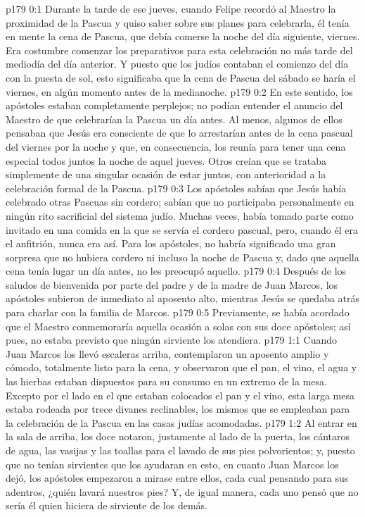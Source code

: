 \author{Comisión de seres intermedios}
\vs p179 0:1 Durante la tarde de ese jueves, cuando Felipe recordó al Maestro la proximidad de la Pascua y quiso saber sobre sus planes para celebrarla, él tenía en mente la cena de Pascua, que debía comerse la noche del día siguiente, viernes. Era costumbre comenzar los preparativos para esta celebración no más tarde del mediodía del día anterior. Y puesto que los judíos contaban el comienzo del día con la puesta de sol, esto significaba que la cena de Pascua del sábado se haría el viernes, en algún momento antes de la medianoche.
\vs p179 0:2 En este sentido, los apóstoles estaban completamente perplejos; no podían entender el anuncio del Maestro de que celebrarían la Pascua un día antes. Al menos, algunos de ellos pensaban que Jesús era consciente de que lo arrestarían antes de la cena pascual del viernes por la noche y que, en consecuencia, los reunía para tener una cena especial todos juntos la noche de aquel jueves. Otros creían que se trataba simplemente de una singular ocasión de estar juntos, con anterioridad a la celebración formal de la Pascua.
\vs p179 0:3 Los apóstoles sabían que Jesús había celebrado otras Pascuas sin cordero; sabían que no participaba personalmente en ningún rito sacrificial del sistema judío. Muchas veces, había tomado parte como invitado en una comida en la que se servía el cordero pascual, pero, cuando él era el anfitrión, nunca era así. Para los apóstoles, no habría significado una gran sorpresa que no hubiera cordero ni incluso la noche de Pascua y, dado que aquella cena tenía lugar un día antes, no les preocupó aquello.
\vs p179 0:4 Después de los saludos de bienvenida por parte del padre y de la madre de Juan Marcos, los apóstoles subieron de inmediato al aposento alto, mientras Jesús se quedaba atrás para charlar con la familia de Marcos.
\vs p179 0:5 Previamente, se había acordado que el Maestro conmemoraría aquella ocasión a solas con sus doce apóstoles; así pues, no estaba previsto que ningún sirviente los atendiera.
\vs p179 1:1 Cuando Juan Marcos los llevó escaleras arriba, contemplaron un aposento amplio y cómodo, totalmente listo para la cena, y observaron que el pan, el vino, el agua y las hierbas estaban dispuestos para su consumo en un extremo de la mesa. Excepto por el lado en el que estaban colocados el pan y el vino, esta larga mesa estaba rodeada por trece divanes reclinables, los mismos que se empleaban para la celebración de la Pascua en las casas judías acomodadas.
\vs p179 1:2 Al entrar en la sala de arriba, los doce notaron, justamente al lado de la puerta, los cántaros de agua, las vasijas y las toallas para el lavado de sus pies polvorientos; y, puesto que no tenían sirvientes que los ayudaran en esto, en cuanto Juan Marcos los dejó, los apóstoles empezaron a mirase entre ellos, cada cual pensando para sus adentros, ¿quién lavará nuestros pies? Y, de igual manera, cada uno pensó que no sería él quien hiciera de sirviente de los demás.
